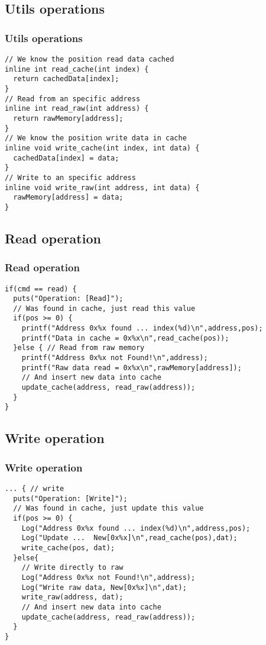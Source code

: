 \documentclass{beamer}
\begin{document}
\subsection{Utils operations}
\begin{frame}[fragile]
\frametitle{Utils operations}
\begin{example}
\begin{lstlisting}
// We know the position read data cached
inline int read_cache(int index) {
  return cachedData[index];
}
// Read from an specific address
inline int read_raw(int address) {
  return rawMemory[address];
}
// We know the position write data in cache
inline void write_cache(int index, int data) {
  cachedData[index] = data;
}
// Write to an specific address
inline void write_raw(int address, int data) {
  rawMemory[address] = data;
}
\end{lstlisting}
\end{example}
\end{frame}
\subsection{Read operation}
\begin{frame}[fragile]
\frametitle{Read operation}
\begin{example}
\begin{lstlisting}
if(cmd == read) {
  puts("Operation: [Read]");
  // Was found in cache, just read this value
  if(pos >= 0) {
    printf("Address 0x%x found ... index(%d)\n",address,pos);
    printf("Data in cache = 0x%x\n",read_cache(pos));
  }else { // Read from raw memory
    printf("Address 0x%x not Found!\n",address);
    printf("Raw data read = 0x%x\n",rawMemory[address]);
    // And insert new data into cache
    update_cache(address, read_raw(address));
  }
}
\end{lstlisting}
\end{example}
\end{frame}
\subsection{Write operation}
\begin{frame}[fragile]
\frametitle{Write operation}
\begin{example}
\begin{lstlisting}
... { // write
  puts("Operation: [Write]");
  // Was found in cache, just update this value
  if(pos >= 0) {
    Log("Address 0x%x found ... index(%d)\n",address,pos);
    Log("Update ...  New[0x%x]\n",read_cache(pos),dat);
    write_cache(pos, dat);
  }else{
    // Write directly to raw   
    Log("Address 0x%x not Found!\n",address);
    Log("Write raw data, New[0x%x]\n",dat);
    write_raw(address, dat);
    // And insert new data into cache
    update_cache(address, read_raw(address));
  }
}
\end{lstlisting}
\end{example}
\end{frame}
\end{document}
